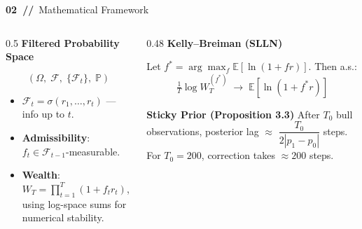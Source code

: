 \documentclass[11pt,aspectratio=169]{beamer}
\newcommand{\E}{\mathbb{E}}
\newcommand{\Prob}{\mathbb{P}}
\newcommand{\ca}[1]{\textcolor{bbamber}{\textbf{#1}}}
\begin{document}
\begin{frame}{\ca{02~//}~Mathematical Framework}
  \begin{columns}[T]
    \begin{column}{0.5\textwidth}
      \ca{Filtered Probability Space}
      {\small
      \[(\Omega,\;\mathcal{F},\;\{\mathcal{F}_t\},\;\Prob)\]
      \begin{itemize}
        \item $\mathcal{F}_t = \sigma(r_1,\ldots,r_t)$ — info up to $t$.
        \item \textbf{Admissibility}: $f_t \in \mathcal{F}_{t-1}$-measurable.
        \item \textbf{Wealth}: $W_T = \prod_{t=1}^T(1+f_t r_t)$, using log-space sums for numerical stability.
      \end{itemize}
      }
    \end{column}
    \begin{column}{0.48\textwidth}
      \ca{Kelly--Breiman (SLLN)}
      \begin{block}{}
        \footnotesize
        Let $f^*=\arg\max_f \E[\ln(1+fr)]$. Then a.s.:
        \[\tfrac{1}{T}\log W_T^{(f^*)}\;\longrightarrow\;\E[\ln(1+f^*r)]\]
      \end{block}
      \vspace{0.3em}
      \ca{Sticky Prior (Proposition 3.3)}
      {\footnotesize
        After $T_0$ bull observations, posterior lag $\approx$
        $\dfrac{T_0}{2|p_1-p_0|}$ steps. For $T_0=200$, correction takes $\approx 200$ steps.
      }
    \end{column}
  \end{columns}
\end{frame}
\end{document}
